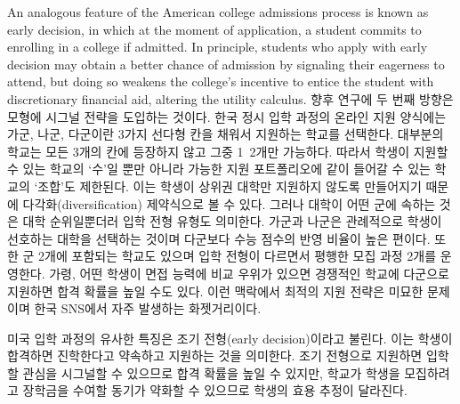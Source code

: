 \documentclass[11pt]{article} %
\theoremstyle{definition}
\theoremstyle{definition}
\begin{document}
An analogous feature of the American college admissions process is known as early decision, in which at the moment of application, a student commits to enrolling in a college if admitted. In principle, students who apply with early decision may obtain a better chance of admission by signaling their eagerness to attend, but doing so weakens the college's incentive to entice the student with discretionary financial aid, altering the utility calculus.
\else
향후 연구에 두 번째 방향은 모형에 시그널 전략을 도입하는 것이다. 한국 정시 입학 과정의 온라인 지원 양식에는 가군, 나군, 다군이란 3가지 선다형 칸을 채워서 지원하는 학교를 선택한다. 대부분의 학교는 모든 3개의 칸에 등장하지 않고 그중 1~2개만 가능하다. 따라서 학생이 지원할 수 있는 학교의 `수'일 뿐만 아니라 가능한 지원 포트폴리오에 같이 들어갈 수 있는 학교의 `조합'도 제한된다. 이는 학생이 상위권 대학만 지원하지 않도록 만들어지기 때문에 다각화(diversification) 제약식으로 볼 수 있다. 그러나 대학이 어떤 군에 속하는 것은 대학 순위일뿐더러 입학 전형 유형도 의미한다. 가군과 나군은 관례적으로 학생이 선호하는 대학을 선택하는 것이며 다군보다 수능 점수의 반영 비율이 높은 편이다. 또한 군 2개에 포함되는 학교도 있으며 입학 전형이 다르면서 평행한 모집 과정 2개를 운영한다. 가령, 어떤 학생이 면접 능력에 비교 우위가 있으면 경쟁적인 학교에 다군으로 지원하면 합격 확률을 높일 수도 있다. 이런 맥락에서 최적의 지원 전략은 미묘한 문제이며 한국 SNS에서 자주 발생하는 화젯거리이다.

미국 입학 과정의 유사한 특징은 조기 전형(early decision)이라고 불린다. 이는 학생이 합격하면 진학한다고 약속하고 지원하는 것을 의미한다. 조기 전형으로 지원하면 입학할 관심을 시그널할 수 있으므로 합격 확률을 높일 수 있지만, 학교가 학생을 모집하려고 장학금을 수여할 동기가 약화할 수 있으므로 학생의 효용 추정이 달라진다.
\fi
\end{document}

